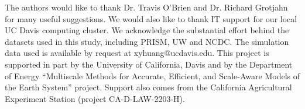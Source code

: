 \documentclass[draft,ms]{agutex}   %
\begin{document}
\begin{article}
\begin{acknowledgments}

The authors would like to thank Dr. Travis O'Brien and Dr. Richard Grotjahn for many useful suggestions. We would also like to thank IT support for our local UC Davis computing cluster. We acknowledge the substantial effort behind the datasets used in this study, including PRISM, UW and NCDC. The simulation data used is available by request at xyhuang@ucdavis.edu. This project is supported in part by the University of California, Davis and by the Department of Energy ``Multiscale Methods for Accurate, Efficient, and Scale-Aware Models of the Earth System'' project. Support also comes from the California Agricultural Experiment Station (project CA-D-LAW-2203-H). 

\end{acknowledgments}





\end{article}


\clearpage
\end{document}
